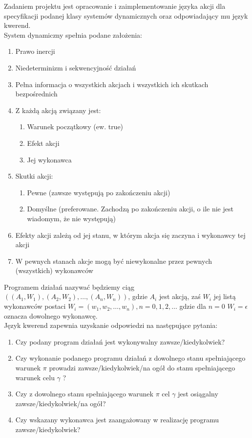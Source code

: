 \documentclass{article}
\begin{document}
Zadaniem projektu jest opracowanie i zaimplementowanie języka akcji dla specyfikacji podanej klasy systemów dynamicznych oraz odpowiadający mu język kwerend.\\

System dynamiczny spełnia podane założenia:
\begin{enumerate}
\item Prawo inercji
\item Niedeterminizm i sekwencyjność działań
\item Pełna informacja o wszystkich akcjach i wszystkich ich skutkach bezpośrednich
\item Z każdą akcją związany jest:
\begin{enumerate}
\item Warunek początkowy (ew. true)
\item Efekt akcji
\item Jej wykonawca
\end{enumerate}
\item Skutki akcji:
\begin{enumerate}
\item Pewne (zawsze występują po zakończeniu akcji)
\item Domyślne (preferowane. Zachodzą po zakończeniu akcji, o ile nie jest wiadomym, że nie występują)
\end{enumerate}
\item Efekty akcji zależą od jej stanu, w którym akcja się zaczyna i wykonawcy tej akcji
\item W pewnych stanach akcje mogą być niewykonalne przez pewnych (wszystkich) wykonawców
\end{enumerate}

Programem działań nazywać będziemy ciąg $((A_{1},W_{1}), (A_{2},W_{2}), …, (A_{n},W_{n}))$, 
gdzie $A_{i}$ jest akcją, zaś $W_{i}$ jej listą wykonawców postaci $W_{i} = (w_{1}, w_{2}, \dots, w_{n}), n = 0, 1, 2, \dots$ gdzie dla $n = 0$ $W_{i} = \epsilon$ oznacza dowolnego wykonawcę.\\


Język kwerend zapewnia uzyskanie odpowiedzi na następujące pytania:
\begin{enumerate}
\item Czy podany program działań jest wykonywalny zawsze/kiedykolwiek?
\item Czy wykonanie podanego programu działań z dowolnego stanu spełniającego warunek $\pi$ prowadzi zawsze/kiedykolwiek/na ogół do stanu spełniającego warunek celu $\gamma$ ?
\item Czy z dowolnego stanu spełniającego warunek $\pi$ cel $\gamma$ jest osiągalny zawsze/kiedykolwiek/na ogół?
\item Czy wskazany wykonawca jest zaangażowany w realizację programu zawsze/kiedykolwiek?
\end{enumerate}
\end{document}
